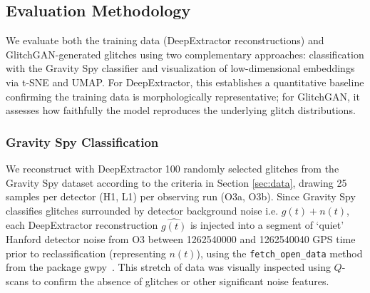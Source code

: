 \documentclass[reprint,nofootinbib,amsmath,amssymb,aps,floatfix]{revtex4-2}
\begin{document}
\subsection{Evaluation Methodology}



We evaluate both the training data (DeepExtractor reconstructions) and GlitchGAN-generated glitches using two complementary approaches: classification with the Gravity Spy classifier and visualization of low-dimensional embeddings via t-SNE and UMAP. 
For DeepExtractor, this establishes a quantitative baseline confirming the training data is morphologically representative; for GlitchGAN, it assesses how faithfully the model reproduces the underlying glitch distributions.

\subsubsection{Gravity Spy Classification}

We reconstruct with DeepExtractor 100 randomly selected glitches from the Gravity Spy dataset according to the criteria in Section \ref{sec:data}, drawing 25 samples per detector (H1, L1) per observing run (O3a, O3b).
Since Gravity Spy classifies glitches surrounded by detector background noise i.e. $g(t) + n(t)$, each DeepExtractor reconstruction $\hat{g(t)}$ is injected into a segment of `quiet' Hanford detector noise from O3 between 1262540000 and 1262540040 GPS time prior to reclassification (representing $n(t)$), using the \texttt{fetch\_open\_data} method from the package gwpy~\cite{gwpy}.
This stretch of data was visually inspected using $Q$-scans to confirm the absence of glitches or other significant noise features.
\end{document}

